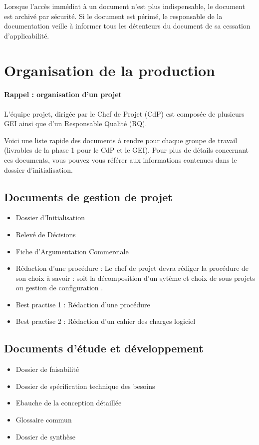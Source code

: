 \documentclass[a4paper]{article}
\begin{document}
Lorsque l'accès immédiat à un document n'est plus indispensable, le document est archivé par sécurité. Si le document est périmé, le responsable de la documentation veille à informer tous les détenteurs du document de sa cessation d'applicabilité.

\section{Organisation de la production}

\paragraph{Rappel : organisation d'un projet} L'équipe projet, dirigée par le Chef de Projet (CdP) est composée de plusieurs GEI ainsi que d'un Responsable Qualité (RQ).

Voici une liste rapide des documents à rendre pour chaque groupe de travail (livrables de la phase 1 pour le CdP et le GEI). 
Pour plus de détails concernant ces documents, vous pouvez vous référer aux informations contenues dans le dossier d'initialisation.

\subsection{Documents de gestion de projet}

\begin{itemize}
\item Dossier d'Initialisation
\item Relevé de Décisions
\item Fiche d'Argumentation Commerciale 
\item Rédaction d'une procédure : Le chef de projet devra rédiger la procédure de son choix à savoir : soit la \og décomposition d'un sytème et choix de sous projets \fg ou \og gestion de configuration \fg.
\item Best practise 1 : Rédaction d'une procédure
\item Best practise 2 : Rédaction d'un cahier des charges logiciel
\end{itemize}


\subsection{Documents d’étude et développement}

\begin{itemize}
\item Dossier de faisabilité
\item Dossier de spécification technique des besoins
\item Ebauche de la conception détaillée
\item Glossaire commun
\item Dossier de synthèse
\end{itemize}
\end{document}
